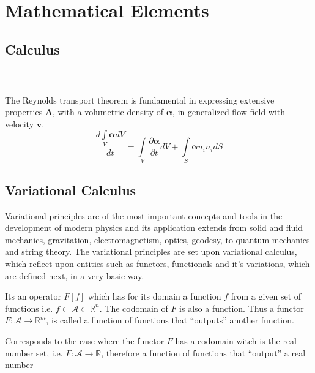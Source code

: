 \chapter{Mathematical Elements}

\section{Calculus}
\begin{teo}
\begin{gather}
    \label{gauss_theorem}
\end{gather}
\end{teo}

\begin{teo}
\begin{gather}
    \label{stokes_theorem}
\end{gather}
\end{teo}

\begin{teo}
The Reynolds transport theorem is fundamental in expressing extensive properties $\boldsymbol{A}$, with a volumetric density of $\boldsymbol\alpha$, in generalized flow field with velocity $\textbf{v}$.
\begin{equation}
    \label{reynolds_theorem}
\frac{d \int\limits_V  \boldsymbol\alpha dV}{dt}
=\int\limits_V \frac{\partial \boldsymbol\alpha}{\partial t} dV +\int\limits_{S} \boldsymbol\alpha u_i n_i dS
\end{equation}
\end{teo}




\section{Variational Calculus}
Variational principles are of the most important concepts and tools in the development of modern physics and its application extends from solid and fluid mechanics, gravitation, electromagnetism, optics, geodesy, to quantum mechanics and string theory.
The variational principles are set upon variational calculus, which reflect upon entities such as functors, functionals and it's  variations, which are defined next, in a very basic way.
\vspace{5mm}
\begin{defi} 
Its an operator $F[f]$ which has for its domain a function $f$ from a given set of functions i.e. $f \subset \mathcal{A} \subset \mathbb{R}^n$. The codomain of $F$ is also a function. Thus a functor $F:\mathcal{A} \rightarrow \mathbb{R}^m$, is called a function of functions that ``outputs'' another function.  
\end{defi}
\begin{defi} 
Corresponds to the case where the functor $F$ has a codomain witch is the real number set, i.e. $F:\mathcal{A} \rightarrow \mathbb{R}$, therefore a function of functions that ``output'' a real number 
\end{defi}

